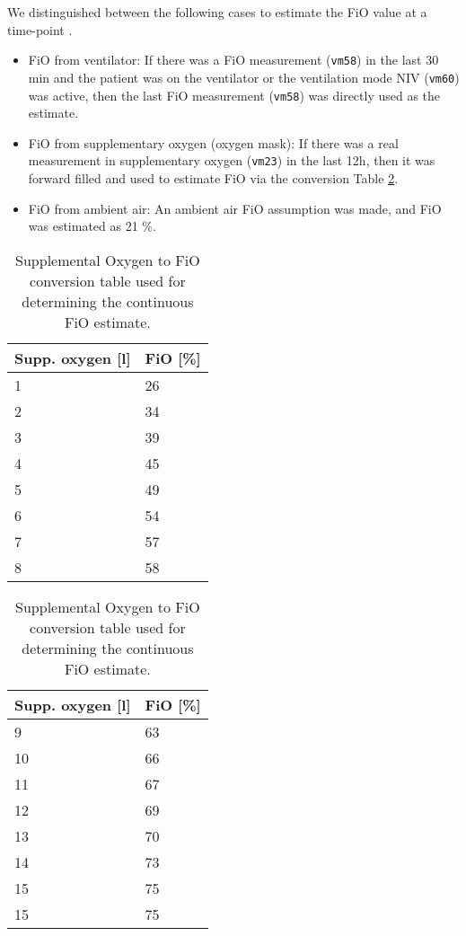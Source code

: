 \documentclass{article}
\begin{document}
We distinguished between the following cases to estimate the FiO value at a time-point . 

\begin{itemize}
    \item FiO from ventilator: If there was a FiO measurement (\texttt{vm58}) in the last 30 min and the patient was on the ventilator or the ventilation mode NIV (\texttt{vm60}) was active, then the last FiO measurement (\texttt{vm58}) was directly used as the estimate.
    \item FiO from supplementary oxygen (oxygen mask): If there was a real measurement in supplementary oxygen (\texttt{vm23}) in the last 12h, then it was forward filled and used to estimate FiO via the conversion Table     \ref{tab:appendix-suppox-conv-table}.
    \item FiO from ambient air: An ambient air FiO assumption was made,
    and FiO was estimated as 21 \%.
\end{itemize}

\begin{table}[!ht]
    \caption{ Supplemental Oxygen to FiO conversion table used for determining the continuous FiO estimate.}
    \label{tab:appendix-suppox-conv-table}
    \begin{center}
        {\selectfont\small
            \begin{tabular}{ll}
                \toprule
                \textbf{Supp. oxygen [l]} & \textbf{FiO [\%]} \\
                \midrule
                1  & 26 \\
                2 & 34 \\
                3 & 39 \\
                4 & 45 \\
                5 & 49 \\
                6 & 54 \\
                7 & 57 \\
                8 & 58 \\
                \bottomrule
            \end{tabular}
            \begin{tabular}{ll}
                \toprule
                \textbf{Supp. oxygen [l]} & \textbf{FiO [\%]} \\
                \midrule
                9 & 63 \\
                10 & 66 \\
                11 & 67 \\
                12 & 69 \\
                13 & 70 \\
                14 & 73 \\
                15 & 75 \\
                15 & 75 \\
                \bottomrule
            \end{tabular}}
    \end{center}
\end{table}
\FloatBarrier
\end{document}
